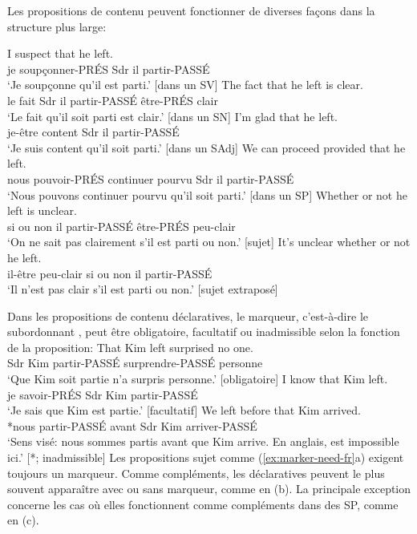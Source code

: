 Les propositions de contenu peuvent fonctionner de diverses façons dans la structure plus large:

\ea \label{ex:content-funcs-fr}
    \ea \gll I suspect {\ob}that he left{\cb}.\\
        je soupçonner-PRÉS Sdr il partir-PASSÉ\\
    \glt `Je soupçonne qu'il est parti.' [dans un SV]
    \ex \gll The fact {\ob}that he left{\cb} is clear.\\
        le fait Sdr il partir-PASSÉ être-PRÉS clair\\
    \glt `Le fait qu'il soit parti est clair.' [dans un SN]
    \ex \gll I'm glad {\ob}that he left{\cb}.\\
        je-être content Sdr il partir-PASSÉ\\
    \glt `Je suis content qu'il soit parti.' [dans un SAdj]
    \ex \gll We can proceed provided {\ob}that he left{\cb}.\\
        nous pouvoir-PRÉS continuer pourvu Sdr il partir-PASSÉ\\
    \glt `Nous pouvons continuer pourvu qu'il soit parti.' [dans un SP]
    \ex \gll Whether or not he left is unclear.\\
        si ou non il partir-PASSÉ être-PRÉS peu-clair\\
    \glt `On ne sait pas clairement s'il est parti ou non.' [sujet]
    \ex \gll It's unclear whether or not he left.\\
        il-être peu-clair si ou non il partir-PASSÉ\\
    \glt `Il n'est pas clair s'il est parti ou non.' [sujet extraposé]
    \z
\z

Dans les propositions de contenu déclaratives, le marqueur, c'est-à-dire le subordonnant , peut être obligatoire, facultatif ou inadmissible selon la fonction de la proposition:
\ea\label{ex:marker-need-fr}
    \ea \gll That Kim left surprised no one.\\
        Sdr Kim partir-PASSÉ surprendre-PASSÉ personne\\
    \glt `Que Kim soit partie n'a surpris personne.' [obligatoire]
    \ex \gll I know that Kim left.\\
        je savoir-PRÉS Sdr Kim partir-PASSÉ\\
    \glt `Je sais que Kim est partie.' [facultatif]
    \ex \gll *We left before that Kim arrived.\\
        *nous partir-PASSÉ avant Sdr Kim arriver-PASSÉ\\
    \glt `Sens visé: nous sommes partis avant que Kim arrive. En anglais,  est impossible ici.' [*; inadmissible]
\z
\z
Les propositions sujet comme (\ref{ex:marker-need-fr}a) exigent toujours un marqueur. Comme compléments, les déclaratives peuvent le plus souvent apparaître avec ou sans marqueur, comme en (b). La principale exception concerne les cas où elles fonctionnent comme compléments dans des SP, comme en (c).

